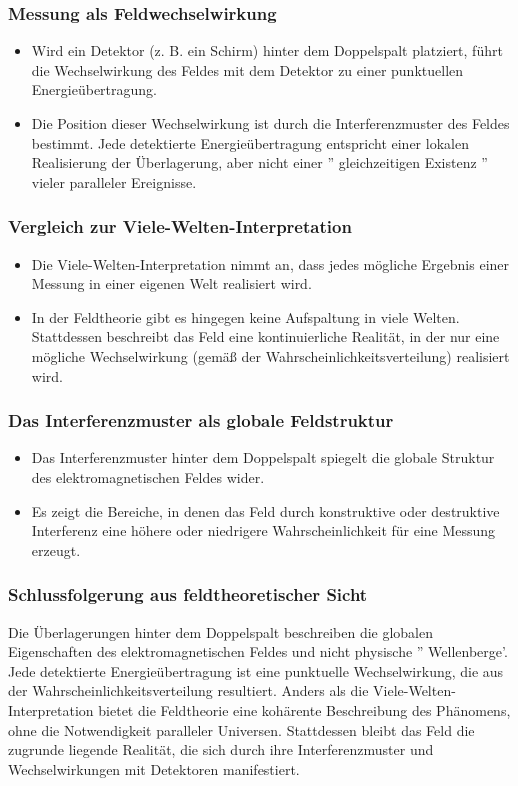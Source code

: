 \documentclass[12pt,a4paper]{article}
\begin{document}
	\subsubsection{Messung als Feldwechselwirkung}
	\begin{itemize}
		\item Wird ein Detektor (z. B. ein Schirm) hinter dem Doppelspalt platziert, führt die Wechselwirkung des Feldes mit dem Detektor zu einer punktuellen Energieübertragung.
		\item Die Position dieser Wechselwirkung ist durch die Interferenzmuster des Feldes bestimmt. Jede detektierte Energieübertragung entspricht einer lokalen Realisierung der Überlagerung, aber nicht einer '' gleichzeitigen Existenz '' vieler paralleler Ereignisse.
	\end{itemize}
	
	\subsubsection{Vergleich zur Viele-Welten-Interpretation}
	\begin{itemize}
		\item Die Viele-Welten-Interpretation nimmt an, dass jedes mögliche Ergebnis einer Messung in einer eigenen Welt realisiert wird.
		\item In der Feldtheorie gibt es hingegen keine Aufspaltung in viele Welten. Stattdessen beschreibt das Feld eine kontinuierliche Realität, in der nur eine mögliche Wechselwirkung (gemäß der Wahrscheinlichkeitsverteilung) realisiert wird.
	\end{itemize}
	
	\subsubsection{Das Interferenzmuster als globale Feldstruktur}
	\begin{itemize}
		\item Das Interferenzmuster hinter dem Doppelspalt spiegelt die globale Struktur des elektromagnetischen Feldes wider.
		\item Es zeigt die Bereiche, in denen das Feld durch konstruktive oder destruktive Interferenz eine höhere oder niedrigere Wahrscheinlichkeit für eine Messung erzeugt.
	\end{itemize}
	
	\subsubsection{Schlussfolgerung aus feldtheoretischer Sicht}
	Die Überlagerungen hinter dem Doppelspalt beschreiben die globalen Eigenschaften des elektromagnetischen Feldes und nicht physische '' Wellenberge'. Jede detektierte Energieübertragung ist eine punktuelle Wechselwirkung, die aus der Wahrscheinlichkeitsverteilung resultiert. Anders als die Viele-Welten-Interpretation bietet die Feldtheorie eine kohärente Beschreibung des Phänomens, ohne die Notwendigkeit paralleler Universen. Stattdessen bleibt das Feld die zugrunde liegende Realität, die sich durch ihre Interferenzmuster und Wechselwirkungen mit Detektoren manifestiert.
	
\end{document}
